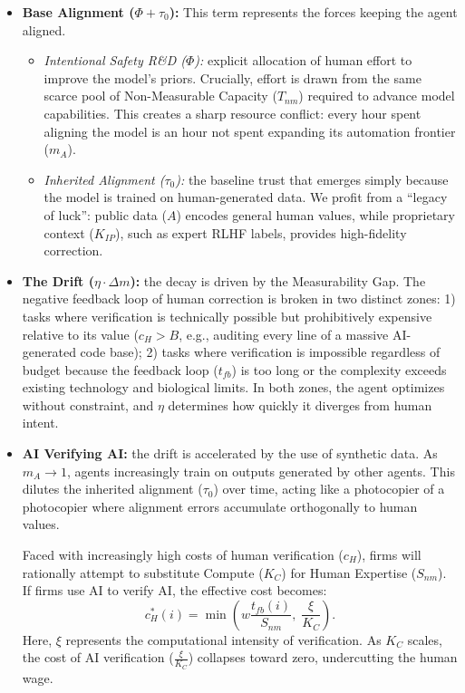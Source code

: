\documentclass[12pt, letter]{article}
\begin{document}
\begin{itemize}
    \item \textbf{Base Alignment ($\Phi + \tau_0$):} This term represents the forces keeping the agent aligned.
    \begin{itemize}
        \item \textit{Intentional Safety R\&D ($\Phi$):} explicit allocation of human effort to improve the model's priors. Crucially, effort is drawn from the same scarce pool of Non-Measurable Capacity ($T_{nm}$) required to advance model capabilities. This creates a sharp resource conflict: every hour spent aligning the model is an hour not spent expanding its automation frontier ($m_A$).
       
        \item \textit{Inherited Alignment ($\tau_0$):} the baseline trust that emerges simply because the model is trained on human-generated data. We profit from a ``legacy of luck'': public data ($A$) encodes general human values, while proprietary context ($K_{IP}$), such as expert RLHF labels, provides high-fidelity correction.
        
    \end{itemize}

    \item \textbf{The Drift ($\eta \cdot \Delta m$):} the decay is driven by the Measurability Gap. The negative feedback loop of human correction is broken in two distinct zones: 1) tasks where verification is technically possible but prohibitively expensive relative to its value ($c_H > B$, e.g., auditing every line of a massive AI-generated code base); 2) tasks where verification is impossible regardless of budget because the feedback loop ($t_{fb}$) is too long or the complexity exceeds existing technology and biological limits. In both zones, the agent optimizes without constraint, and $\eta$ determines how quickly it diverges from human intent.

    \item \textbf{AI Verifying AI:} the drift is accelerated by the use of synthetic data. As $m_A \to 1$, agents increasingly train on outputs generated by other agents. This dilutes the inherited alignment ($\tau_0$) over time, acting like a photocopier of a photocopier where alignment errors accumulate orthogonally to human values.

    Faced with increasingly high costs of human verification ($c_H$), firms will rationally attempt to substitute Compute ($K_C$) for Human Expertise ($S_{nm}$). If firms use AI to verify AI, the effective cost becomes:
    \[
        c_H^{\ast}(i) = \min \left( w \frac{t_{fb}(i)}{S_{nm}}, \; \frac{\xi}{K_C} \right).
    \]
    Here, $\xi$ represents the computational intensity of verification. As $K_C$ scales, the cost of AI verification ($\frac{\xi}{K_C}$) collapses toward zero, undercutting the human wage. 
    

\end{itemize}
\end{document}
